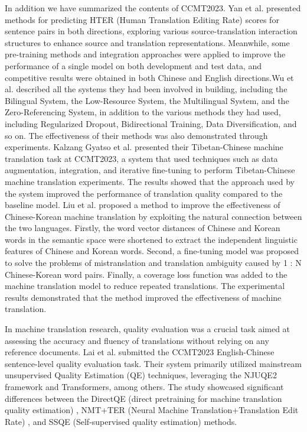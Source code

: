 \documentclass[acmsmall]{acmart}
\begin{document}
In addition we have summarized the contents of CCMT2023. Yan et al. \cite{yan2023transn} presented methods for predicting HTER (Human Translation Editing Rate) scores for sentence pairs in both directions, exploring various source-translation interaction structures to enhance source and translation representations. Meanwhile, some pre-training methods and integration approaches were applied to improve the performance of a single model on both development and test data, and competitive results were obtained in both Chinese and English directions.Wu et al. \cite{10.1007/978-981-99-7894-62} described all the systems they had been involved in building, including the Bilingual System, the Low-Resource System, the Multilingual System, and the Zero-Referencing System, in addition to the various methods they had used, including Regularized Dropout, Bidirectional Training, Data Diversification, and so on. The effectiveness of their methods was also demonstrated through experiments. Kalzang Gyatso et al. \cite{gyatso2023ccmt2023} presented their Tibetan-Chinese machine translation task at CCMT2023, a system that used techniques such as data augmentation, integration, and iterative fine-tuning to perform Tibetan-Chinese machine translation experiments. The results showed that the approach used by the system improved the performance of translation quality compared to the baseline model. Liu et al. \cite{10.1007/978-981-99-7894-64} proposed a method to improve the effectiveness of Chinese-Korean machine translation by exploiting the natural connection between the two languages. Firstly, the word vector distances of Chinese and Korean words in the semantic space were shortened to extract the independent linguistic features of Chinese and Korean words. Second, a fine-tuning model was proposed to solve the problems of mistranslation and translation ambiguity caused by 1 : N Chinese-Korean word pairs. Finally, a coverage loss function was added to the machine translation model to reduce repeated translations. The experimental results demonstrated that the method improved the effectiveness of machine translation.

In machine translation research, quality evaluation was a crucial task aimed at assessing the accuracy and fluency of translations without relying on any reference documents. Lai et al. \cite{10.1007/978-981-99-7894-65} submitted the CCMT2023 English-Chinese sentence-level quality evaluation task. Their system primarily utilized mainstream unsupervised Quality Estimation (QE) techniques, leveraging the NJUQE2 framework and Transformers, among others. The study showcased significant differences between the DirectQE (direct pretraining for machine translation quality estimation) \cite{cui2021directqe}, NMT+TER (Neural Machine Translation+Translation Edit Rate) \cite{snover2006study}, and SSQE (Self-supervised quality estimation) \cite{zheng2021self} methods.
\end{document}
